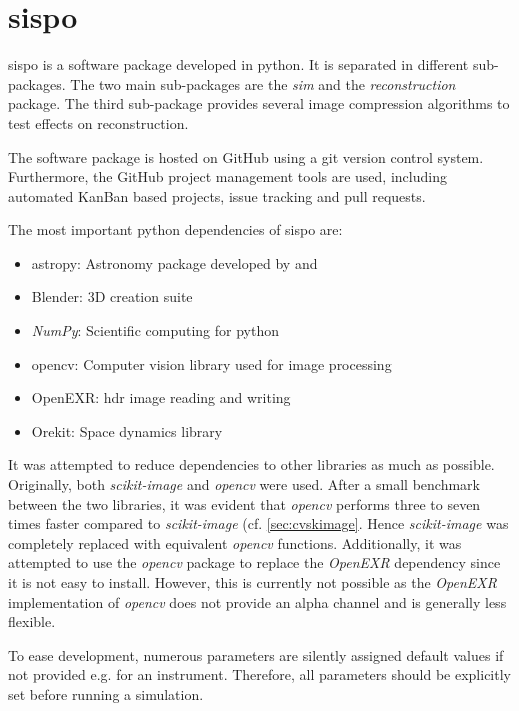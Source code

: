 \section{\Acrlong{sispo}} \label{sec:sispo}

\gls{sispo} is a software package developed in python. It is separated in different sub-packages. The two main sub-packages are the \textit{sim} and the \textit{reconstruction} package. The third sub-package provides several image compression algorithms to test effects on reconstruction.

The software package is hosted on GitHub using a git version control system. Furthermore, the GitHub project management tools are used, including automated KanBan based projects, issue tracking and pull requests.

The most important python dependencies of \gls{sispo} are:
\begin{itemize}
    \item astropy: Astronomy package developed by \cite{robitaille2013astropy} and \cite{price2018astropy}
    \item Blender: 3D creation suite \cite{blender}
    \item \textit{NumPy}: Scientific computing for python \cite{oliphant2006guideNumPy}
    \item opencv: Computer vision library used for image processing \cite{opencv_library}
    \item OpenEXR: \gls{hdr} image reading and writing \cite{openexr}
    \item Orekit: Space dynamics library \cite{orekit}
\end{itemize}

It was attempted to reduce dependencies to other libraries as much as possible. Originally, both \textit{scikit-image} and \textit{opencv} were used. After a small benchmark between the two libraries, it was evident that \textit{opencv} performs three to seven times faster compared to \textit{scikit-image} (cf. \ref{sec:cvskimage}. Hence \textit{scikit-image} was completely replaced with equivalent \textit{opencv} functions. Additionally, it was attempted to use the \textit{opencv} package to replace the \textit{OpenEXR} dependency since it is not easy to install. However, this is currently not possible as the \textit{OpenEXR} implementation of \textit{opencv} does not provide an alpha channel and is generally less flexible.

To ease development, numerous parameters are silently assigned default values if not provided e.g. for an instrument. Therefore, all parameters should be explicitly set before running a simulation.

